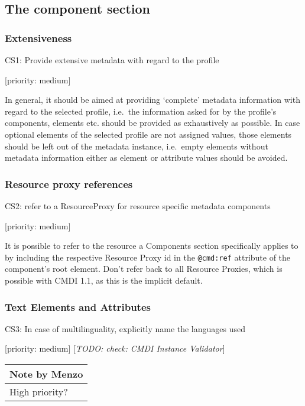 \documentclass[]{article}
\date{}
\begin{document}
\subsection{The component section}\label{the-component-section}

\subsubsection{Extensiveness}\label{extensiveness}

CS1: Provide extensive metadata with regard to the profile

{[}priority: medium{]}

In general, it should be aimed at providing `complete' metadata
information with regard to the selected profile, i.e.~the information
asked for by the profile's components, elements etc. should be provided
as exhaustively as possible. In case optional elements of the selected
profile are not assigned values, those elements should be left out of
the metadata instance, i.e.~empty elements without metadata information
either as element or attribute values should be avoided.

\subsubsection{Resource proxy
references}\label{resource-proxy-references}

CS2: refer to a ResourceProxy for resource specific metadata components

{[}priority: medium{]}

It is possible to refer to the resource a Components section
specifically applies to by including the respective Resource Proxy id in
the \texttt{@cmd:ref} attribute of the component's root element. Don't
refer back to all Resource Proxies, which is possible with CMDI 1.1, as
this is the implicit default.

\subsubsection{Text Elements and Attributes}\label{vocabularies}

CS3: In case of multilinguality, explicitly name the languages used

{[}priority: medium{]} {[}\emph{TODO: check: CMDI Instance Validator}{]}

\begin{longtable}[c]{@{}l@{}}
\toprule
Note by Menzo\tabularnewline
\midrule
\endhead
High priority?\tabularnewline
\bottomrule
\end{longtable}
\end{document}

